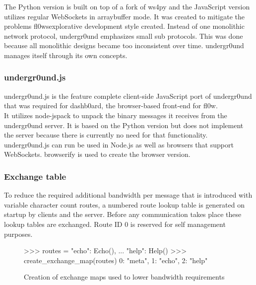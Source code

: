 \documentclass[conference]{IEEEtran}
\begin{document}
The Python\cite{Python:Python Foundation} version is built on top of a fork of ws4py\cite{ws4py:Philip Trauner} and the JavaScript version utilizes regular WebSockets\cite{The WebSocket Protocol:A. Melnikov} in arraybuffer mode. It was created to mitigate the problems fl0ws\cite{fl0w:Philip Trauner}explorative development style created. Instead of one monolithic network protocol, undergr0und emphasizes small sub protocols. This was done because all monolithic designs became too inconsistent over time. undergr0und\cite{undergr0und:Philip Trauner} manages itself through its own concepts.\\

\subsubsection{undergr0und.js}
undergr0und.js\cite{undergr0und.js:Philip Trauner} is the feature complete client-side JavaScript port of undergr0und\cite{undergr0und:Philip Trauner} that was required for dashb0ard\cite{dashb0ard:Sebastian Schaffler}, the browser-based front-end for fl0w\cite{fl0w:Philip Trauner}. \\It utilizes node-jspack\cite{node-jspack:Peter Griess} to unpack the binary messages it receives from the undergr0und\cite{undergr0und:Philip Trauner} server. It is based on the Python\cite{Python:Python Foundation} version but does not implement the server because there is currently no need for that functionality. \\undergr0und.js can run be used in Node.js\cite{Node.js:Node.js Foundation} as well as browsers that support WebSockets\cite{The WebSocket Protocol:A. Melnikov}. browserify\cite{browserify:James Halliday} is used to create the browser version.\\

\subsubsection{Exchange table}
To reduce the required additional bandwidth per message that is introduced with variable character count routes, a numbered route lookup table is generated on startup by clients and the server. Before any communication takes place these lookup tables are exchanged. Route ID 0 is reserved for self management purposes.\\

\begin{figure}[H]
\centering
\begin{python}
>>> routes = {"echo": Echo(),
...    "help": Help()}
>>> create_exchange_map(routes)
{0: "meta", 1: "echo", 2: "help"}
\end{python}
\caption{Creation of exchange maps used to lower bandwidth requirements}
\end{figure}
\end{document}
